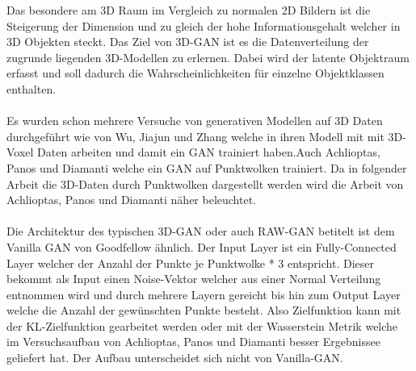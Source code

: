 \documentclass{llncs}
\begin{document}
Das besondere am 3D Raum im Vergleich zu normalen 2D Bildern ist die Steigerung der Dimension und zu gleich der hohe Informationsgehalt welcher in 3D Objekten steckt. Das Ziel von 3D-GAN ist es die Datenverteilung der zugrunde liegenden 3D-Modellen zu erlernen. Dabei wird der latente Objektraum erfasst und soll dadurch die Wahrscheinlichkeiten für einzelne Objektklassen enthalten. 
\\\\
Es wurden schon mehrere Versuche von generativen Modellen auf 3D Daten durchgeführt wie von Wu, Jiajun und Zhang \cite{3d} welche in ihren Modell mit mit 3D-Voxel Daten arbeiten und damit ein GAN trainiert haben.Auch Achlioptas, Panos und Diamanti\cite{3dgan} welche ein GAN auf Punktwolken trainiert. Da in folgender Arbeit die 3D-Daten durch Punktwolken dargestellt werden wird die Arbeit von Achlioptas, Panos und Diamanti näher beleuchtet.
\\\\
Die Architektur des typischen 3D-GAN oder auch RAW-GAN betitelt ist dem Vanilla GAN von Goodfellow ähnlich. Der Input Layer ist ein Fully-Connected Layer welcher der Anzahl der Punkte je Punktwolke * 3 entspricht. Dieser bekommt als Input einen Noise-Vektor welcher aus einer Normal Verteilung entnommen wird und durch mehrere Layern gereicht bis hin zum Output Layer welche die Anzahl der gewünschten Punkte besteht. Also Zielfunktion kann mit der KL-Zielfunktion gearbeitet werden oder mit der Wasserstein Metrik welche im Versuchsaufbau von Achlioptas, Panos und Diamanti besser Ergebnissee geliefert hat. Der Aufbau unterscheidet sich nicht von Vanilla-GAN\cite{3dgan}. 
\end{document}
